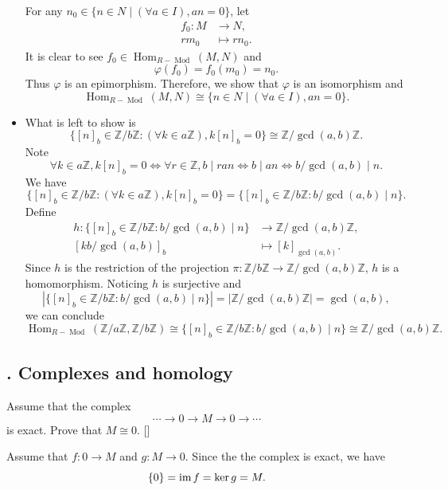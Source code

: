 \documentclass[12pt,letterpaper,boxed]{hmcpset}
\newcommand{\im}{\mathrm{im}\hspace{1.5pt}}
\begin{document}
\begin{solution}
\begin{itemize}
For any $n_0\in\{n \in N \mid(\forall a \in I), a n=0\}$, let
\begin{align*}
	f_0:M &\longrightarrow N ,\\
	rm_0&\longmapsto rn_0.
\end{align*}
It is clear to see $f_0\in \operatorname{Hom}_{R-\operatorname{Mod}}(M, N)$ and
\[
\varphi(f_0)=f_0(m_0)=n_0.
\]
Thus $\varphi$ is an epimorphism.
Therefore, we show that $\varphi$ is an isomorphism and 
\[
\operatorname{Hom}_{R-\operatorname{Mod}}(M, N) \cong\{n \in N \mid(\forall a \in I), a n=0\}.
\]
\item What is left to show is 
\[
\{[n]_b \in \mathbb{Z} / b \mathbb{Z} :(\forall k \in  a \mathbb{Z}), k [n]_b=0\}\cong\mathbb{Z} / \operatorname{gcd}(a, b) \mathbb{Z}.
\]
Note
\[
\forall k \in  a \mathbb{Z}, k [n]_b=0\iff \forall r\in\mathbb{Z},b\mid ran \iff b\mid an \iff  b/\gcd(a, b)\mid n.
\]
We have
\[
\{[n]_b \in \mathbb{Z} / b \mathbb{Z} :(\forall k \in  a \mathbb{Z}), k [n]_b=0\}=\{[n]_b \in \mathbb{Z} / b \mathbb{Z} : b/\gcd(a, b)\mid n\}.
\]
Define
\begin{align*}
	h:\{[n]_b \in \mathbb{Z} / b \mathbb{Z} : b/\gcd(a, b)\mid n\} &\longrightarrow\mathbb{Z}/\operatorname{gcd}(a, b) \mathbb{Z} ,\\
	[kb/\gcd(a, b)]_b&\longmapsto [k]_{\operatorname{gcd}(a, b)}.
\end{align*}
Since $h$ is the restriction of the projection $\pi:\mathbb{Z} / b \mathbb{Z}\to \mathbb{Z}/\operatorname{gcd}(a, b) \mathbb{Z}$, $h$ is a homomorphism. Noticing $h$ is surjective and 
\[
\left|\{[n]_b \in \mathbb{Z} / b \mathbb{Z} : b/\gcd(a, b)\mid n\}\right|=\left|\mathbb{Z}/\operatorname{gcd}(a, b) \mathbb{Z}\right|=\operatorname{gcd}(a, b),
\]
we can conclude
\[
\operatorname{Hom}_{R-\operatorname{Mod}}(\mathbb{Z} / a \mathbb{Z}, \mathbb{Z} / b \mathbb{Z}) \cong\{[n]_b \in \mathbb{Z} / b \mathbb{Z} : b/\gcd(a, b)\mid n\} \cong \mathbb{Z} / \operatorname{gcd}(a, b) \mathbb{Z}.
\]
\end{itemize}
\end{solution}


\subsection{. Complexes and homology}
\begin{problem}[7.1]
Assume that the complex
\[
\cdots \longrightarrow 0 \longrightarrow M \longrightarrow 0 \longrightarrow \cdots
\]
is exact. Prove that $M\cong0$. []
\end{problem}
\begin{solution}
Assume that $f:0\to M$ and $g:M\to 0$. Since the the complex is exact, we have $$\{0\}=\im f=\ker g=M.$$
\end{solution}
\end{document}
